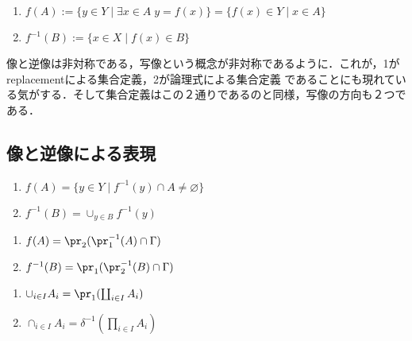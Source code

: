 \documentclass[uplatex,dvipdfmx]{jsreport}
\begin{document}
\begin{definition}\mbox{}
    \begin{enumerate}
        \item $f(A):=\{y\in Y\mid\exists x\in A\;y=f(x)\}=\{f(x)\in Y\mid x\in A\}$
        \item $f^{-1}(B):=\{x\in X\mid f(x)\in B\}$
    \end{enumerate}
\end{definition}
\begin{remark}
    像と逆像は非対称である，写像という概念が非対称であるように．これが，1がreplacementによる集合定義，2が論理式による集合定義
    であることにも現れている気がする．そして集合定義はこの２通りであるのと同様，写像の方向も２つである．
\end{remark}

\subsection{像と逆像による表現}

\begin{proposition}[fiberの言葉による像と逆像の特徴付け]\mbox{}
    \begin{enumerate}
        \item $f(A)=\{y\in Y\mid f^{-1}(y)\cap A\ne\varnothing\}$
        \item $f^{-1}(B)=\cup_{y\in B}f^{-1}(y)$
    \end{enumerate}
\end{proposition}
\begin{proposition}[グラフと射影の言葉による特徴付け]\mbox{}
    \begin{enumerate}
        \item $f(A)=\pr_2(\pr_1^{-1}(A)\cap\Gamma)$
        \item $f^{-1}(B)=\pr_1(\pr_2^{-1}(B)\cap\Gamma)$
    \end{enumerate}
\end{proposition}

\begin{example}\mbox{}
    \begin{enumerate}
        \item $\cup_{i\in I}A_i=\pr_1(\coprod_{i\in I}A_i)$
        \item $\cap_{i\in I}A_i=\delta^{-1}(\prod_{i\in I}A_i)$
    \end{enumerate}
\end{example}
\end{document}
